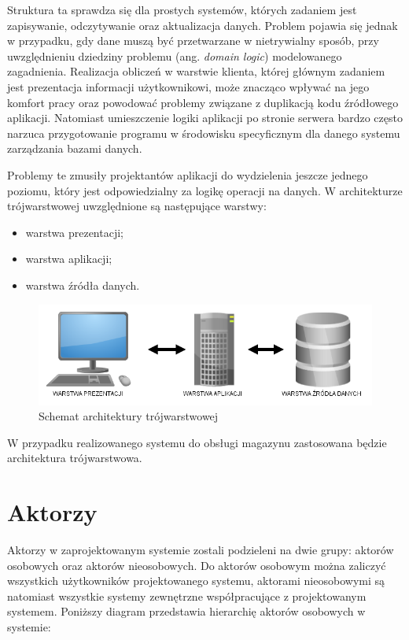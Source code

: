 Struktura ta sprawdza się dla prostych systemów, których zadaniem jest
zapisywanie, odczytywanie oraz aktualizacja danych. Problem
pojawia się jednak w przypadku, gdy dane muszą być przetwarzane w
nietrywialny sposób, przy uwzględnieniu dziedziny problemu (ang. \emph{domain
logic}) modelowanego zagadnienia. Realizacja obliczeń w warstwie klienta,
której głównym zadaniem jest prezentacja informacji użytkownikowi, może
znacząco wpływać na jego komfort pracy oraz powodować problemy związane z
duplikacją kodu źródłowego aplikacji.
Natomiast umieszczenie logiki aplikacji po stronie serwera bardzo często narzuca
przygotowanie programu w środowisku specyficznym dla danego systemu zarządzania
bazami danych. 

Problemy te zmusiły projektantów aplikacji do wydzielenia jeszcze jednego
poziomu, który jest odpowiedzialny za logikę operacji na danych. W
architekturze trójwarstwowej uwzględnione są następujące warstwy:
\begin{itemize}
 \item warstwa prezentacji;
 \item warstwa aplikacji;
 \item warstwa źródła danych.
\end{itemize}

\begin{figure}[h]
    \begin{center}
    \includegraphics[scale=0.5]{../img/arch-3warstw.png}
    \end{center}
    \label{fig:arch3warstw}
    \caption{Schemat architektury trójwarstwowej}
\end{figure}
\FloatBarrier
W przypadku realizowanego systemu do obsługi magazynu zastosowana będzie
architektura trójwarstwowa.



\section{Aktorzy}

Aktorzy w zaprojektowanym systemie zostali podzieleni na dwie grupy: aktorów
osobowych oraz aktorów nieosobowych. Do aktorów osobowym można zaliczyć
wszystkich użytkowników projektowanego systemu, aktorami nieosobowymi są
natomiast wszystkie systemy zewnętrzne współpracujące z projektowanym systemem.
Poniższy diagram przedstawia hierarchię aktorów osobowych w systemie:

